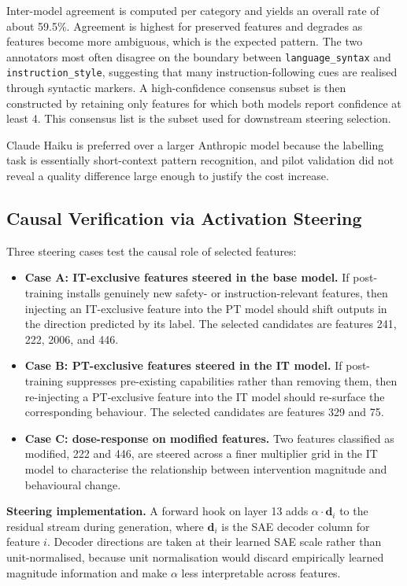 Inter-model agreement is computed per category and yields an overall rate of about 59.5\%. Agreement is highest for preserved features and degrades as features become more ambiguous, which is the expected pattern. The two annotators most often disagree on the boundary between \texttt{language\_syntax} and \texttt{instruction\_style}, suggesting that many instruction-following cues are realised through syntactic markers. A high-confidence consensus subset is then constructed by retaining only features for which both models report confidence at least 4. This consensus list is the subset used for downstream steering selection.

Claude Haiku is preferred over a larger Anthropic model because the labelling task is essentially short-context pattern recognition, and pilot validation did not reveal a quality difference large enough to justify the cost increase.

\subsection{Causal Verification via Activation Steering}
\label{subsec:causal-verification}

Three steering cases test the causal role of selected features:
\begin{itemize}
    \item \textbf{Case A: IT-exclusive features steered in the base model.} If post-training installs genuinely new safety- or instruction-relevant features, then injecting an IT-exclusive feature into the PT model should shift outputs in the direction predicted by its label. The selected candidates are features 241, 222, 2006, and 446.
    \item \textbf{Case B: PT-exclusive features steered in the IT model.} If post-training suppresses pre-existing capabilities rather than removing them, then re-injecting a PT-exclusive feature into the IT model should re-surface the corresponding behaviour. The selected candidates are features 329 and 75.
    \item \textbf{Case C: dose-response on modified features.} Two features classified as modified, 222 and 446, are steered across a finer multiplier grid in the IT model to characterise the relationship between intervention magnitude and behavioural change.
\end{itemize}

\textbf{Steering implementation.} A forward hook on layer 13 adds $\alpha \cdot \mathbf{d}_i$ to the residual stream during generation, where $\mathbf{d}_i$ is the SAE decoder column for feature $i$. Decoder directions are taken at their learned SAE scale rather than unit-normalised, because unit normalisation would discard empirically learned magnitude information and make $\alpha$ less interpretable across features.

